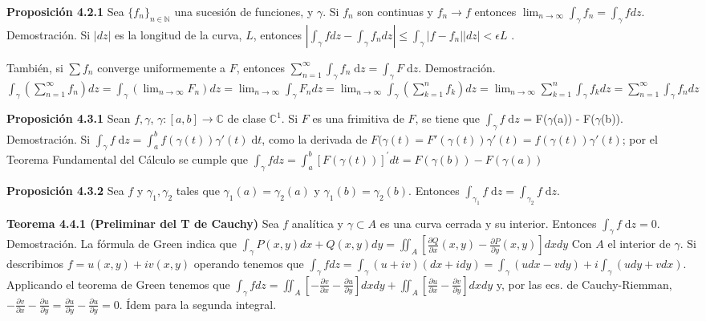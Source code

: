 \documentclass[a4paper, 11pt]{extarticle}
\newcommand{\tma}[1]{\textcolor{rojo}{\textbf{Teorema #1}}}
\newcommand{\propo}[1]{\textcolor{rojo}{\textbf{Proposición #1}}}
\newcommand{\dem}[1]{\textcolor{gris}{\small{Demostración. #1}}}
\begin{document}
\begin{multicols*}{2}
\propo{4.2.1} Sea \(\{ f_n \}_{n \in \mathbb{N}}\) una sucesión de funciones,
y \(\gamma\). Si \(f_n\) son continuas y \(f_n \rightarrow  f\) entonces
\(\lim_{n \to \infty} \int _{\gamma} f_n = \int _\gamma f dz\). 
\dem{ Si \( |dz| \) es la longitud de la curva, \( L \), entonces 
\( \left|\int_{\gamma} f d z-\int_{\gamma} f_{n} d z\right| \leq \int_{\gamma}\left|f-f_{n}\right||d z|<\epsilon L \) }.

También, si \(\sum f_n\) converge uniformemente a \(F\), entonces \(\sum
_{n=1}^{\infty} \int _\gamma f_n \; \text{d}z  = \int _\gamma F \; \text{d}z\). 
\dem{ \(
\int_{\gamma}\left(\sum_{n=1}^{\infty} f_{n}\right) d z =\int_{\gamma}\left(\lim _{n \rightarrow \infty} F_{n}\right) d z=\lim _{n \rightarrow \infty} \int_{\gamma} F_{n} d z 
=\lim _{n \rightarrow \infty} \int_{\gamma}\left(\sum_{k=1}^{n} f_{k}\right) d z=\lim _{n \rightarrow \infty} \sum_{k=1}^{n} \int_{\gamma} f_{k} d z=\sum_{n=1}^{\infty} \int_{\gamma} f_{n} d z
 \)  }


\propo{4.3.1} Sean \(f, \gamma\), \(\gamma: [a,b] \rightarrow  \mathbb{C}\) de clase \(\mathbb{C}^1\). Si
\(F\) es una frimitiva de \(F\), se tiene que \(\int _\gamma f \; \text{d}
z\) = F(\(\gamma\)(a)) - F(\(\gamma\)(b)).
\dem{ Si \( \int _\gamma f \; \text{d}z = \int_ { a }^{ b } f(\gamma(t))\gamma'(t) \; \text{d}t   \), como la derivada de 
\( F(\gamma(t) = F'(\gamma(t))\gamma'(t) = f(\gamma(t))\gamma'(t) \); por el Teorema Fundamental del Cálculo se cumple 
que \(\int_{\gamma} f d z =\int_{a}^{b}[F(\gamma(t))]^{\prime} d t=F(\gamma(b))-F(\gamma(a)) \)}

\propo{4.3.2} Sea \(f\) y \(\gamma_1, \gamma_2\) tales que \(\gamma_1(a) =
\gamma_2(a)\) y \(\gamma_1(b) = \gamma_2(b)\). Entonces \(\int _{\gamma_1}f
\; \text{d}z  = \int _{\gamma_2}f \; \text{d}z\).


\tma{4.4.1 (Preliminar del T de Cauchy)} Sea \(f\) analítica y \(\gamma
\subset A\) es una curva cerrada y su interior. Entonces \(\int _\gamma f \;
\text{d}z  = 0\).
\dem{ La fórmula de Green indica que \( \int_{\gamma} P(x, y) d x+Q(x, y) d y=\iint_{A}\left[\frac{\partial Q}{\partial x}(x, y)-\frac{\partial P}{\partial y}(x, y)\right] d x d y \)
Con \( A \) el interior de \( \gamma \). Si describimos \( f = u(x,y) + iv(x,y) \) operando
tenemos que 
\(\int_{\gamma} f d z =\int_{\gamma}(u+i v)(d x+i d y) 
=\int_{\gamma}(u d x-v d y)+i \int_{\gamma}(u d y+v d x)\). Applicando el teorema de Green 
tenemos que \( \int_{\gamma} f d z=\iint_{A}\left[-\frac{\partial v}{\partial x}-\frac{\partial u}{\partial y}\right] d x d y+\iint_{A}\left[\frac{\partial u}{\partial x}-\frac{\partial v}{\partial y}\right] d x d y \)
y, por las ecs. de Cauchy-Riemman, \( - \frac{\partial v}{\partial x} - \frac{\partial u}{\partial y} = 
\frac{\partial u}{\partial y} - \frac{\partial u}{\partial y} = 0\). Ídem para la segunda integral.  }


\end{multicols*}
\end{document}
